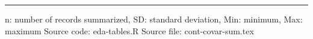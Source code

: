 \vspace{0.67cm}
 
\begin{minipage}{1\linewidth}
\linespread{1.1}\selectfont
\rule{1\linewidth}{0.4pt}
\vspace{0.02cm}
n: number of records summarized,
                 SD: standard deviation,
                 Min: minimum, Max: maximum \newline
Source code: eda-tables.R \newline
Source file: cont-covar-sum.tex \newline
\end{minipage}
